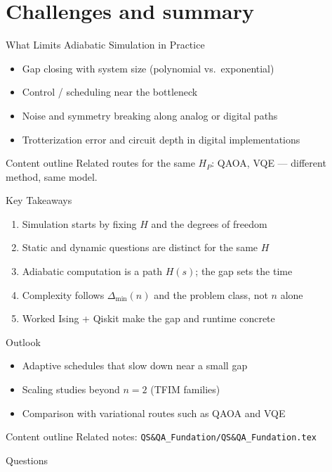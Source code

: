 \documentclass[
	11pt,
	aspectratio=169,
	compress,
]{beamer}
\newcommand{\outlinebox}[1]{%
	\vspace{0.25em}%
	\begin{block}{Content outline}
		#1
	\end{block}
}
\begin{document}
\section{Challenges and summary}
\begin{frame}{What Limits Adiabatic Simulation in Practice}
	\begin{itemize}
		\item Gap closing with system size (polynomial vs.\ exponential)
		\item Control / scheduling near the bottleneck
		\item Noise and symmetry breaking along analog or digital paths
		\item Trotterization error and circuit depth in digital implementations
	\end{itemize}
	\outlinebox{Related routes for the same $H_P$: QAOA, VQE --- different method, same model.}
\end{frame}

\begin{frame}{Key Takeaways}
	\begin{enumerate}
		\item Simulation starts by fixing $H$ and the degrees of freedom
		\item Static and dynamic questions are distinct for the same $H$
		\item Adiabatic computation is a path $H(s)$; the gap sets the time
		\item Complexity follows $\Delta_{\min}(n)$ and the problem class, not $n$ alone
		\item Worked Ising + Qiskit make the gap and runtime concrete
	\end{enumerate}
\end{frame}

\begin{frame}{Outlook}
	\begin{itemize}
		\item Adaptive schedules that slow down near a small gap
		\item Scaling studies beyond $n=2$ (TFIM families)
		\item Comparison with variational routes such as QAOA and VQE
	\end{itemize}
	\outlinebox{Related notes: \texttt{QS\&QA\_Fundation/QS\&QA\_Fundation.tex}}
\end{frame}

\appendix
{}

\begin{frame}
	\begin{center}
		{\LARGE Questions}
	\end{center}
\end{frame}
\end{document}
